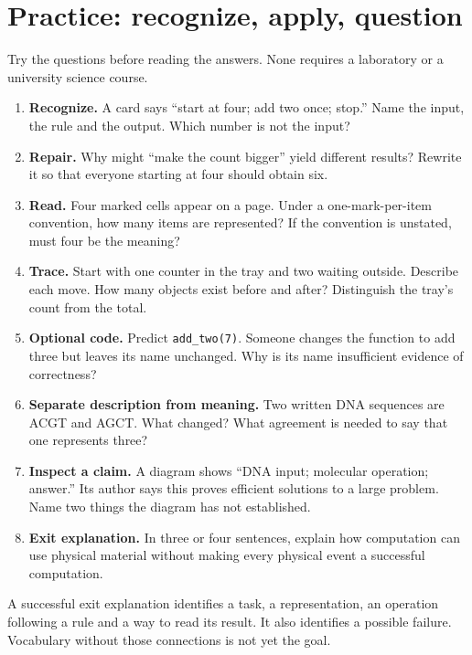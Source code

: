 \clearpage
\section{Practice: recognize, apply, question}\label{sec:practice}
Try the questions before reading the answers. None requires a laboratory or a university science course.
\begin{enumerate}
\item \textbf{Recognize.} A card says “start at four; add two once; stop.” Name the input, the rule and the output. Which number is not the input?
\item \textbf{Repair.} Why might “make the count bigger” yield different results? Rewrite it so that everyone starting at four should obtain six.
\item \textbf{Read.} Four marked cells appear on a page. Under a one-mark-per-item convention, how many items are represented? If the convention is unstated, must four be the meaning?
\item \textbf{Trace.} Start with one counter in the tray and two waiting outside. Describe each move. How many objects exist before and after? Distinguish the tray's count from the total.
\item \textbf{Optional code.} Predict \texttt{add\_two(7)}. Someone changes the function to add three but leaves its name unchanged. Why is its name insufficient evidence of correctness?
\item \textbf{Separate description from meaning.} Two written DNA sequences are ACGT and AGCT. What changed? What agreement is needed to say that one represents three?
\item \textbf{Inspect a claim.} A diagram shows “DNA input; molecular operation; answer.” Its author says this proves efficient solutions to a large problem. Name two things the diagram has not established.
\item \textbf{Exit explanation.} In three or four sentences, explain how computation can use physical material without making every physical event a successful computation.
\end{enumerate}
A successful exit explanation identifies a task, a representation, an operation following a rule and a way to read its result. It also identifies a possible failure. Vocabulary without those connections is not yet the goal.

